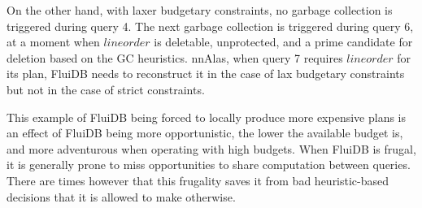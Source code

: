 On the other hand, with laxer budgetary constraints, no garbage
collection is triggered during query 4. The next garbage collection is
triggered during query 6, at a moment when \(\mathit{lineorder}\) is
deletable, unprotected, and a prime candidate for deletion based on
the GC heuristics. nnAlas, when query 7 requires \(\mathit{lineorder}\)
for its plan, FluiDB needs to reconstruct it in the case of lax
budgetary constraints but not in the case of strict constraints.

This example of FluiDB being forced to locally produce more expensive
plans is an effect of FluiDB being more opportunistic, the lower the
available budget is, and more adventurous when operating with high
budgets. When FluiDB is frugal, it is generally prone to miss
opportunities to share computation between queries. There are times
however that this frugality saves it from bad heuristic-based
decisions that it is allowed to make otherwise.

